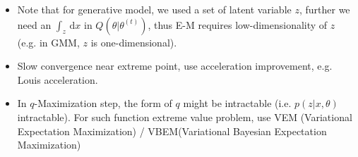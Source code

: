\begin{itemize}[topsep=2pt,itemsep=0pt]
    \item Note that for generative model, we used a set of latent variable $ z $, further we need an $ \int _z \,\mathrm{d}x $ in $ Q(\theta |\theta ^{(t)}) $, thus E-M requires low-dimensionality of $ z $ (e.g. in GMM, $ z $ is one-dimensional).
    \item Slow convergence near extreme point, use acceleration improvement, e.g. Louis acceleration.
    \item In $ q $-Maximization step, the form of $ q $ might be intractable (i.e. $ p(z|x,\theta ) $ intractable). For such function extreme value problem, use VEM (Variational Expectation Maximization) / VBEM(Variational Bayesian Expectation Maximization)
\end{itemize}


    
    





        

